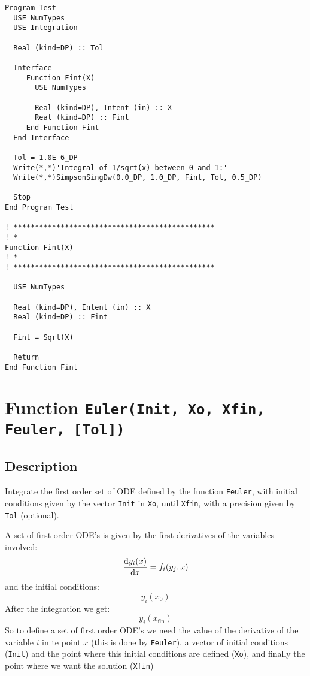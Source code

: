 \begin{lstlisting}[emph=SimpsonSingDW,
                   emphstyle=\color{blue},
                   frame=trBL,
                   caption=Integrating functions with singularities in
                   the lower limit.,
                   label=simpsonsingdw]
Program Test
  USE NumTypes
  USE Integration

  Real (kind=DP) :: Tol

  Interface 
     Function Fint(X)
       USE NumTypes

       Real (kind=DP), Intent (in) :: X
       Real (kind=DP) :: Fint
     End Function Fint
  End Interface

  Tol = 1.0E-6_DP
  Write(*,*)'Integral of 1/sqrt(x) between 0 and 1:'
  Write(*,*)SimpsonSingDw(0.0_DP, 1.0_DP, Fint, Tol, 0.5_DP)

  Stop
End Program Test

! ***********************************************
! *
Function Fint(X)
! *  
! ***********************************************

  USE NumTypes

  Real (kind=DP), Intent (in) :: X
  Real (kind=DP) :: Fint

  Fint = Sqrt(X)

  Return
End Function Fint
\end{lstlisting}

\section{Function \texttt{Euler(Init, Xo, Xfin, Feuler, [Tol])}}

\subsection{Description}

Integrate the first order set of ODE defined by the function
\texttt{Feuler}, with initial conditions given by the vector
\texttt{Init} in \texttt{Xo}, until \texttt{Xfin}, with a precision
given by \texttt{Tol} (optional).

A set of first order ODE's is given by the first derivatives of the
variables involved:
\begin{displaymath}
  \frac{\mathrm{d} y_i(x)}{\mathrm{d} x} = f_i(y_j, x)
\end{displaymath}
and the initial conditions:
\begin{displaymath}
  y_i(x_0)
\end{displaymath}
After the integration we get:
\begin{displaymath}
  y_i(x_{\text{fin}})
\end{displaymath}
So to define a set of first order ODE's we need the value of the
derivative of the variable $i$ in te point $x$ (this is done by
\texttt{Feuler}), a vector of initial conditions (\texttt{Init}) and
the point where this initial conditions are defined (\texttt{Xo}), and
finally the point where we want the solution (\texttt{Xfin})

